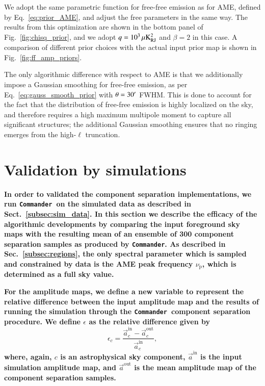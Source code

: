 \documentclass[twocolumn]{aa}
\def\commander{\texttt{Commander}}
\renewcommand{\a}[0]{\vec{a}}
\begin{document}
We adopt the same parametric function for free-free emission as for
AME, defined by Eq.~\eqref{eq:prior_AME}, and adjust the free
parameters in the same way. The results from this optimization are
shown in the bottom panel of Fig.~\ref{fig:chisq_prior}, and we
adopt $q=10^3\muK_{\mathrm{RJ}}^2$ and $\beta=2$ in this case. A comparison of
different prior choices with the actual input prior map is shown in
Fig.~\ref{fig:ff_amp_priors}.

The only algorithmic difference with respect to AME is that we
additionally impose a Gaussian smoothing for free-free emission, as
per Eq.~\eqref{eq:gauss_smooth_prior} with $\theta=30\arcm$ FWHM. This
is done to account for the fact that the distribution of free-free
emission is highly localized on the sky, and therefore requires a high
maximum multipole moment to capture all significant structures; the
additional Gaussian smoothing ensures that no ringing emerges from the
high-$\ell$ truncation.

\section{\textbf{Validation by simulations}}
\label{sec:sim_results}

\textbf{In order to validated the component separation
  implementations, we run \commander\ on the simulated data as
  described in Sect.~\ref{subsec:sim_data}. In this section we
  describe the efficacy of the algorithmic developments by comparing
  the input foreground sky maps with the resulting mean of an ensemble
  of 300 component separation samples as produced by \commander. As
  described in Sec.~\ref{subsec:regions}, the only spectral parameter
  which is sampled and constrained by data is the AME peak frequency
  $\nu_\mathrm{p}$, which is determined as a full sky value.
}

\textbf{For the amplitude maps, we define a new variable to represent the relative difference between the input amplitude map and the results of running the simulation through the \commander\ component separation procedure. We define $\epsilon$ as the relative difference given by}
\begin{equation}
\epsilon_c = \frac{\a_c^\mathrm{in}-\a_c^\mathrm{out}}{\a_c^\mathrm{in}},
\label{eq:rel_diff}
\end{equation}
\textbf{where, again, $c$ is an astrophysical sky component, $\a^{\mathrm{in}}$ is the input simulation amplitude map, and $\a^{\mathrm{out}}$ is the mean amplitude map of the component separation samples.}
\end{document}
